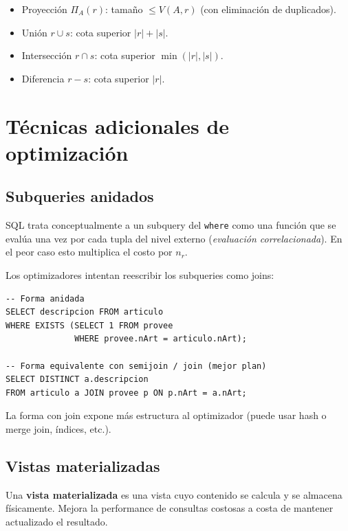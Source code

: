 \documentclass[11pt,a4paper]{article}
\newcommand{\proy}[1]{\Pi_{#1}}
\begin{document}
\begin{itemize}
    \item Proyección $\proy{A}(r)$: tamaño $\le V(A,r)$ (con eliminación de
    duplicados).
    \item Unión $r\cup s$: cota superior $|r| + |s|$.
    \item Intersección $r\cap s$: cota superior $\min(|r|,|s|)$.
    \item Diferencia $r - s$: cota superior $|r|$.
\end{itemize}

\section{Técnicas adicionales de optimización}

\subsection{Subqueries anidados}

SQL trata conceptualmente a un subquery del \texttt{where} como una función
que se evalúa una vez por cada tupla del nivel externo (\emph{evaluación
correlacionada}). En el peor caso esto multiplica el costo por $n_r$.

Los optimizadores intentan reescribir los subqueries como joins:

\begin{lstlisting}
-- Forma anidada
SELECT descripcion FROM articulo
WHERE EXISTS (SELECT 1 FROM provee
              WHERE provee.nArt = articulo.nArt);

-- Forma equivalente con semijoin / join (mejor plan)
SELECT DISTINCT a.descripcion
FROM articulo a JOIN provee p ON p.nArt = a.nArt;
\end{lstlisting}

La forma con join expone más estructura al optimizador (puede usar hash o
merge join, índices, etc.).

\subsection{Vistas materializadas}

Una \textbf{vista materializada} es una vista cuyo contenido se calcula y
se almacena físicamente. Mejora la performance de consultas costosas a
costa de mantener actualizado el resultado.
\end{document}
